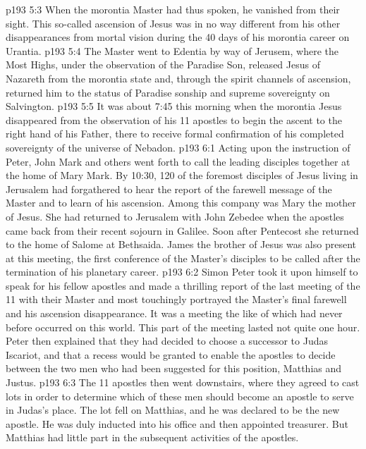 \vs p193 5:3 \pc When the morontia Master had thus spoken, he vanished from their sight. This so\hyp{}called ascension of Jesus was in no way different from his other disappearances from mortal vision during the 40 days of his morontia career on Urantia.
\vs p193 5:4 The Master went to Edentia by way of Jerusem, where the Most Highs, under the observation of the Paradise Son, released Jesus of Nazareth from the morontia state and, through the spirit channels of ascension, returned him to the status of Paradise sonship and supreme sovereignty on Salvington.
\vs p193 5:5 It was about 7:45 this morning when the morontia Jesus disappeared from the observation of his 11 apostles to begin the ascent to the right hand of his Father, there to receive formal confirmation of his completed sovereignty of the universe of Nebadon.
\vs p193 6:1 Acting upon the instruction of Peter, John Mark and others went forth to call the leading disciples together at the home of Mary Mark. By 10:30, 120 of the foremost disciples of Jesus living in Jerusalem had forgathered to hear the report of the farewell message of the Master and to learn of his ascension. Among this company was Mary the mother of Jesus. She had returned to Jerusalem with John Zebedee when the apostles came back from their recent sojourn in Galilee. Soon after Pentecost she returned to the home of Salome at Bethsaida. James the brother of Jesus was also present at this meeting, the first conference of the Master’s disciples to be called after the termination of his planetary career.
\vs p193 6:2 Simon Peter took it upon himself to speak for his fellow apostles and made a thrilling report of the last meeting of the 11 with their Master and most touchingly portrayed the Master’s final farewell and his ascension disappearance. It was a meeting the like of which had never before occurred on this world. This part of the meeting lasted not quite one hour. Peter then explained that they had decided to choose a successor to Judas Iscariot, and that a recess would be granted to enable the apostles to decide between the two men who had been suggested for this position, Matthias and Justus.
\vs p193 6:3 The 11 apostles then went downstairs, where they agreed to cast lots in order to determine which of these men should become an apostle to serve in Judas’s place. The lot fell on Matthias, and he was declared to be the new apostle. He was duly inducted into his office and then appointed treasurer. But Matthias had little part in the subsequent activities of the apostles.
